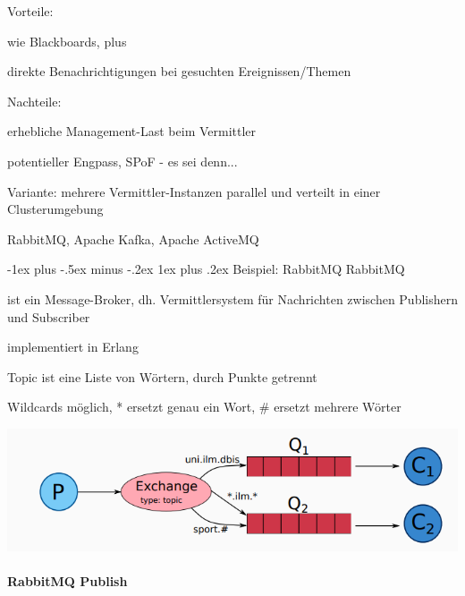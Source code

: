 \documentclass[10pt]{article}
\makeatletter
\renewcommand{\subsubsection}{\@startsection{subsubsection}{3}{0mm}%
                                {-1ex plus -.5ex minus -.2ex}%
                                {1ex plus .2ex}%
                                {\normalfont\small\bfseries}}
\makeatother
\begin{document}
\begin{itemize*}
  \item Vorteile:
  \begin{itemize*}
    \item wie Blackboards, plus
    \item direkte Benachrichtigungen bei gesuchten Ereignissen/Themen
  \end{itemize*}
  \item Nachteile:
  \begin{itemize*}
    \item erhebliche Management-Last beim Vermittler
    \begin{itemize*}
      \item potentieller Engpass, SPoF - es sei denn...
    \end{itemize*}
  \end{itemize*}
  Variante: mehrere Vermittler-Instanzen parallel und verteilt in einer Clusterumgebung
  \begin{itemize*}
    \item RabbitMQ, Apache Kafka, Apache ActiveMQ
  \end{itemize*}
\end{itemize*}

\subsubsection{Beispiel: RabbitMQ}
RabbitMQ
\begin{itemize*}
  \item ist ein Message-Broker, dh. Vermittlersystem für Nachrichten zwischen Publishern und Subscriber
  \item implementiert in Erlang
  \begin{itemize*}
    \item Topic ist eine Liste von Wörtern, durch Punkte getrennt
    \item Wildcards möglich, * ersetzt genau ein Wort, \# ersetzt mehrere Wörter
  \end{itemize*}
\end{itemize*}
\begin{center}
  \includegraphics[width=0.4\linewidth]{Assets/Programmierparadigmen-rabbitmq}
\end{center}

\paragraph{RabbitMQ Publish}
\end{document}
